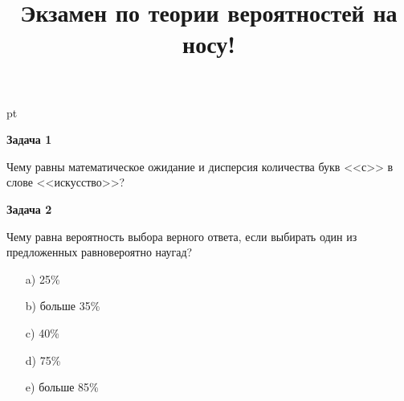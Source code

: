 \documentclass[pdftex,12pt,a4paper]{article}
\title{Экзамен по теории вероятностей на носу!}
\date{}
\begin{document}
 pt %
\maketitle



\textbf{Задача 1}


Чему равны математическое ожидание и дисперсия количества букв <<с>> в слове <<искусство>>?

\vspace{20pt}


\textbf{Задача 2}

Чему равна вероятность выбора верного ответа, если выбирать один из предложенных равновероятно наугад?
\begin{enumerate}
\item[a)] 25\%
\item[b)] больше 35\%
\item[c)] 40\%
\item[d)] 75\%
\item[e)] больше 85\%
\end{enumerate}
\end{document}
